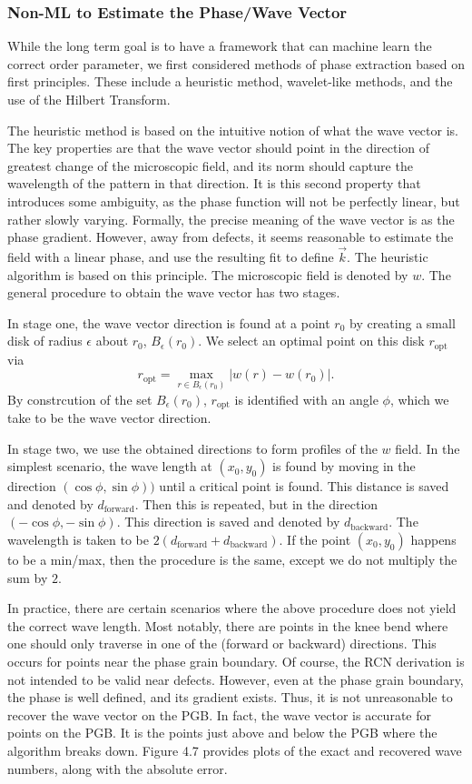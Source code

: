 \documentclass[12pt]{article}
\numberwithin{equation}{section}
\begin{document}
\subsubsection{Non-ML to Estimate the Phase/Wave Vector}
\par While the long term goal is to have a framework that can machine learn the correct order parameter, we first considered methods of phase extraction based on first principles. These include a heuristic method, wavelet-like methods, and the use of the Hilbert Transform. 
\par The heuristic method is based on the intuitive notion of what the wave vector is. The key properties are that the wave vector should point in the direction of greatest change of the microscopic field, and its norm should capture the wavelength of the pattern in that direction. It is this second property that introduces some ambiguity, as the phase function will not be perfectly linear, but rather slowly varying. Formally, the precise meaning of the wave vector is as the phase gradient. However, away from defects, it seems reasonable to estimate the field with a linear phase, and use the resulting fit to define $\vec{k}$. The heuristic algorithm is based on this principle.
The microscopic field is denoted by $w$. The general procedure to obtain the wave vector has two stages.
\par In stage one, the wave vector direction is found at a point $r_0$ by creating a small disk of radius $\epsilon$ about $r_0$, $B_{\epsilon}(r_0)$. We select an optimal point on this disk $r_{\text{opt}}$ via
\[
    r_{\text{opt}} = \max_{r \in B_{\epsilon}(r_0)}|w(r)-w(r_0)|.
\]
By constrcution of the set $B_{\epsilon}(r_0)$, $r_{\text{opt}}$ is identified with an angle $\phi$, which we take to be the wave vector direction.
\par In stage two, we use the obtained directions to form profiles of the $w$ field. In the simplest scenario, the wave length at $(x_0,y_0)$ is found by moving in the direction $(\cos{\phi},\sin{\phi}))$ until a critical point is found. This distance is saved and denoted by $d_{\text{forward}}$. Then this is repeated, but in the direction $(-\cos{\phi},-\sin{\phi})$. This direction is saved and denoted by $d_{\text{backward}}$. The wavelength is taken to be $2(d_{\text{forward}}+d_{\text{backward}})$. If the point $(x_0,y_0)$ happens to be a min/max, then the procedure is the same, except we do not multiply the sum by $2$.
\par In practice, there are certain scenarios where the above procedure does not yield the correct wave length. Most notably, there are points in the knee bend where one should only traverse in one of the (forward or backward) directions. This occurs for points near the phase grain boundary. Of course, the RCN derivation is not intended to be valid near defects. However, even at the phase grain boundary, the phase is well defined, and its gradient exists. Thus, it is not unreasonable to recover the wave vector on the PGB. In fact, the wave vector is accurate for points on the PGB. It is the points just above and below the PGB where the algorithm breaks down. Figure 4.7 provides plots of the exact and recovered wave numbers, along with the absolute error.
\end{document}
